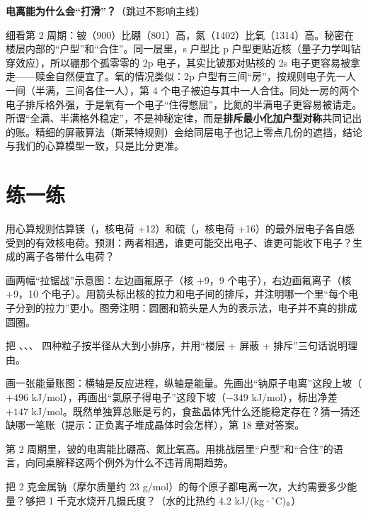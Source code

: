 \begin{tiaozhan}
\textbf{电离能为什么会“打滑”？}（跳过不影响主线）

细看第 2 周期：铍（900）比硼（801）高，氮（1402）比氧（1314）高。秘密在楼层内部的“户型”和“合住”。同一层里，s 户型比 p 户型更贴近核（量子力学叫钻穿效应），所以硼那个孤零零的 2p 电子，其实比铍那对贴核的 2s 电子更容易被拿走——赎金自然便宜了。氧的情况类似：2p 户型有三间“房”，按规则电子先一人一间（半满，三间各住一人），第 4 个电子被迫与其中一人合住。同处一房的两个电子排斥格外强，于是氧有一个电子“住得憋屈”，比氮的半满电子更容易被请走。所谓“全满、半满格外稳定”，不是神秘定律，而是\textbf{排斥最小化加户型对称}共同记出的账。精细的屏蔽算法（斯莱特规则）会给同层电子也记上零点几份的遮挡，结论与我们的心算模型一致，只是比分更准。
\end{tiaozhan}

\section*{练一练}

\begin{sikaoti}
\item 用心算规则估算镁（，核电荷 +12）和硫（，核电荷 +16）的最外层电子各自感受到的有效核电荷。预测：两者相遇，谁更可能交出电子、谁更可能收下电子？生成的离子各带什么电荷？
\item 画两幅“拉锯战”示意图：左边画氟原子（核 +9，9 个电子），右边画氟离子（核 +9，10 个电子）。用箭头标出核的拉力和电子间的排斥，并注明哪一个里“每个电子分到的拉力”更小。图旁注明：圆圈和箭头是人为的表示法，电子并不真的排成圆圈。
\item 把 、、、 四种粒子按半径从大到小排序，并用“楼层 + 屏蔽 + 排斥”三句话说明理由。
\item 画一张能量账图：横轴是反应进程，纵轴是能量。先画出“钠原子电离”这段上坡（$+496$ kJ/mol），再画出“氯原子得电子”这段下坡（$-349$ kJ/mol），标出净差 $+147$ kJ/mol。既然单独算总账是亏的，食盐晶体凭什么还能稳定存在？猜一猜还缺哪一笔账（提示：正负离子堆成晶体时会怎样），第 18 章对答案。
\item 第 2 周期里，铍的电离能比硼高、氮比氧高。用挑战层里“户型”和“合住”的语言，向同桌解释这两个例外为什么不违背周期趋势。
\item 把 2 克金属钠（摩尔质量约 23 g/mol）的每个原子都电离一次，大约需要多少能量？够把 1 千克水烧开几摄氏度？（水的比热约 4.2 kJ/(kg·$^{\circ}$C)。）
\end{sikaoti}
